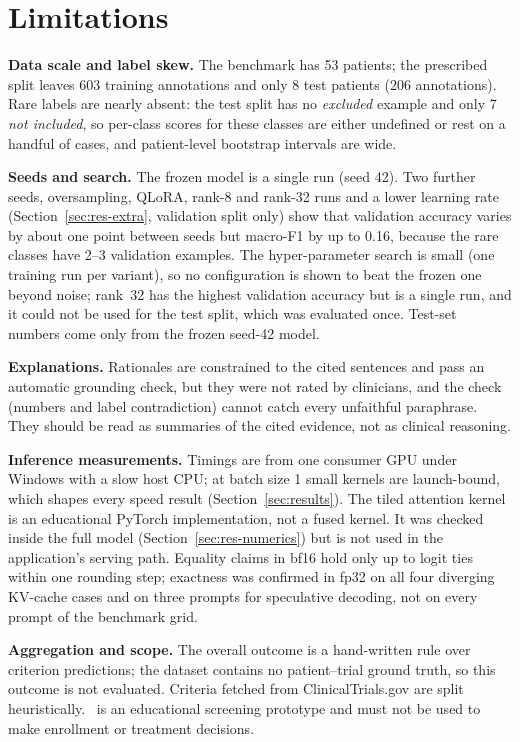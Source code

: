 \section{Limitations}\label{sec:limits}
\textbf{Data scale and label skew.} The benchmark has 53 patients; the prescribed split leaves 603 training
annotations and only 8 test patients (206 annotations). Rare labels are nearly absent: the test split has no
\emph{excluded} example and only 7 \emph{not included}, so per-class scores for these classes are either
undefined or rest on a handful of cases, and patient-level bootstrap intervals are wide.

\textbf{Seeds and search.} The frozen model is a single run (seed 42). Two further seeds, oversampling, QLoRA, rank-8 and rank-32
runs and a lower learning rate (Section~\ref{sec:res-extra}, validation split only) show that validation accuracy varies by about one
point between seeds but macro-F1 by up to 0.16, because the rare classes have 2--3 validation examples. The
hyper-parameter search is small (one training run per variant), so no configuration is shown to beat the frozen one
beyond noise; rank~32 has the highest validation accuracy but is a single run, and it could not be used for the
test split, which was evaluated once. Test-set numbers come only from the frozen seed-42 model.

\textbf{Explanations.} Rationales are constrained to the cited sentences and pass an automatic grounding check,
but they were not rated by clinicians, and the check (numbers and label contradiction) cannot catch every
unfaithful paraphrase. They should be read as summaries of the cited evidence, not as clinical reasoning.

\textbf{Inference measurements.} Timings are from one consumer GPU under Windows with a slow host CPU; at
batch size 1 small kernels are launch-bound, which shapes every speed result (Section~\ref{sec:results}). The
tiled attention kernel is an educational PyTorch implementation, not a fused kernel. It was checked inside the
full model (Section~\ref{sec:res-numerics}) but is not used in the application's serving path. Equality
claims in bf16 hold only up to logit ties within one rounding step; exactness was confirmed in fp32 on all four diverging KV-cache cases and on three
prompts for speculative decoding, not on every prompt of the benchmark grid.

\textbf{Aggregation and scope.} The overall outcome is a hand-written rule over criterion predictions; the
dataset contains no patient--trial ground truth, so this outcome is not evaluated. Criteria fetched from
ClinicalTrials.gov are split heuristically. \sys\ is an educational screening prototype and must not be used
to make enrollment or treatment decisions.
